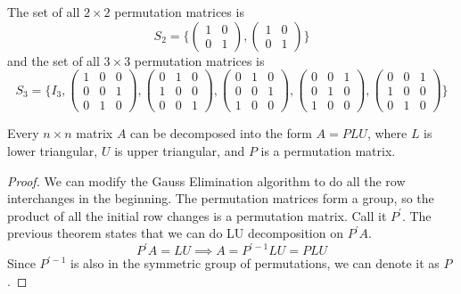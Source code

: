   \begin{example}
    The set of all $2 \times 2$ permutation matrices is 
    \begin{equation}
      S_2 = \bigg\{  \begin{pmatrix}1 & 0 \\0 & 1 \end{pmatrix}, \begin{pmatrix}1 & 0 \\0 & 1 \end{pmatrix} \bigg\}
    \end{equation}
    and the set of all $3 \times 3$ permutation matrices is
    \begin{equation}
      S_3 = \Bigg\{I_3, 
      \begin{pmatrix}1 & 0 & 0 \\0 & 0 & 1 \\0 & 1 & 0 \end{pmatrix},
      \begin{pmatrix}0 & 1 & 0 \\1 & 0 & 0 \\0 & 0 & 1 \end{pmatrix}, 
      \begin{pmatrix}0 & 1 & 0 \\0 & 0 & 1 \\1 & 0 & 0 \end{pmatrix}, 
      \begin{pmatrix}0 & 0 & 1 \\0 & 1 & 0 \\1 & 0 & 0 \end{pmatrix}, 
      \begin{pmatrix}0 & 0 & 1 \\1 & 0 & 0 \\0 & 1 & 0 \end{pmatrix} \Bigg\}
    \end{equation}
  \end{example}

  \begin{theorem}
    Every $n \times n$ matrix $A$ can be decomposed into the form $A = P L U$, where $L$ is lower triangular, $U$ is upper triangular, and $P$ is a permutation matrix. 
  \end{theorem}
  \begin{proof}
    We can modify the Gauss Elimination algorithm to do all the row interchanges in the beginning. The permutation matrices form a group, so the product of all the initial row changes is a permutation matrix. Call it $P^\prime$. The previous theorem states that we can do LU decomposition on $P^\prime A$. 
    \begin{equation}
      P^\prime A = LU \implies A = P^{\prime -1} L U = P L U
    \end{equation}
    Since $P^{\prime -1}$ is also in the symmetric group of permutations, we can denote it as $P$. 
  \end{proof}

